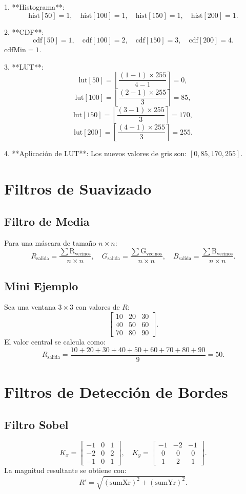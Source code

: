 \documentclass[11pt]{article}
\begin{document}
1. **Histograma**:
   \[
   \text{hist}[50] = 1, \quad \text{hist}[100] = 1, \quad \text{hist}[150] = 1, \quad \text{hist}[200] = 1.
   \]

2. **CDF**:
   \[
   \text{cdf}[50] = 1, \quad \text{cdf}[100] = 2, \quad \text{cdf}[150] = 3, \quad \text{cdf}[200] = 4.
   \]
   \(\text{cdfMin} = 1\).

3. **LUT**:
   \[
   \text{lut}[50] = \left\lfloor \frac{(1 - 1) \times 255}{4 - 1} \right\rceil = 0,
   \]
   \[
   \text{lut}[100] = \left\lfloor \frac{(2 - 1) \times 255}{3} \right\rceil = 85,
   \]
   \[
   \text{lut}[150] = \left\lfloor \frac{(3 - 1) \times 255}{3} \right\rceil = 170,
   \]
   \[
   \text{lut}[200] = \left\lfloor \frac{(4 - 1) \times 255}{3} \right\rceil = 255.
   \]

4. **Aplicación de LUT**:
   Los nuevos valores de gris son: \([0, 85, 170, 255]\).

\section{Filtros de Suavizado}

\subsection{Filtro de Media}
Para una máscara de tamaño \(n \times n\):
\[
R_{\text{salida}} = \frac{ \sum \text{R}_{\text{vecinos}} }{n \times n}, \quad
G_{\text{salida}} = \frac{ \sum \text{G}_{\text{vecinos}} }{n \times n}, \quad
B_{\text{salida}} = \frac{ \sum \text{B}_{\text{vecinos}} }{n \times n}.
\]

\subsection{Mini Ejemplo}
Sea una ventana \(3 \times 3\) con valores de \(R\):
\[
\begin{bmatrix}
10 & 20 & 30\\
40 & 50 & 60\\
70 & 80 & 90
\end{bmatrix}.
\]
El valor central se calcula como:
\[
R_{\text{salida}} = \frac{10 + 20 + 30 + 40 + 50 + 60 + 70 + 80 + 90}{9} = 50.
\]

\section{Filtros de Detección de Bordes}

\subsection{Filtro Sobel}
\[
K_x = 
\begin{bmatrix}
-1 & 0 & 1\\
-2 & 0 & 2\\
-1 & 0 & 1
\end{bmatrix},
\quad
K_y =
\begin{bmatrix}
-1 & -2 & -1\\
\;\,0 & \;\,0 & \;\,0\\
\;\,1 & \;\,2 & \;\,1
\end{bmatrix}.
\]
La magnitud resultante se obtiene con:
\[
R' = \sqrt{( \text{sumXr} )^2 + ( \text{sumYr} )^2}.
\]
\end{document}
